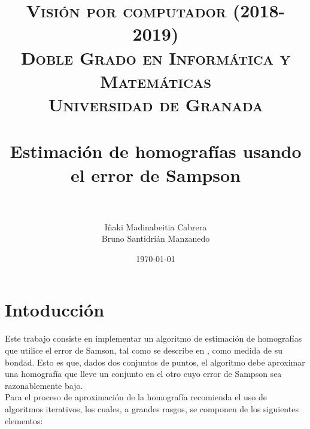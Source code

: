 

\title{	
\normalfont \normalsize 
\textsc{\textbf{Visión por computador (2018-2019)} \\ Doble Grado en Informática y Matemáticas \\ Universidad de Granada} \\ [25pt]
\horrule{0.5pt} \\[0.4cm]
\huge Estimación de homografías usando el error de Sampson \\
\horrule{1pt} \\[0.5cm]
}
\author{Iñaki Madinabeitia Cabrera\\
Bruno Santidrián Manzanedo}
\date{\normalsize\today}




\maketitle
\newpage
\tableofcontents
\newpage

\section{Intoducción}
Este trabajo consiste en implementar un algoritmo de estimación de homografías que utilice el error de Samson, tal como se describe en \cite{mvg}, como medida de su bondad. Esto es que, dados dos conjuntos de puntos, el algoritmo debe aproximar una homografía que lleve un conjunto en el otro cuyo error de Sampson sea razonablemente bajo.\\

Para el proceso de aproximación de la homografía \cite{mvg} recomienda el uso de algoritmos iterativos, los cuales, a grandes rasgos, se componen de los siguientes elementos:\\

